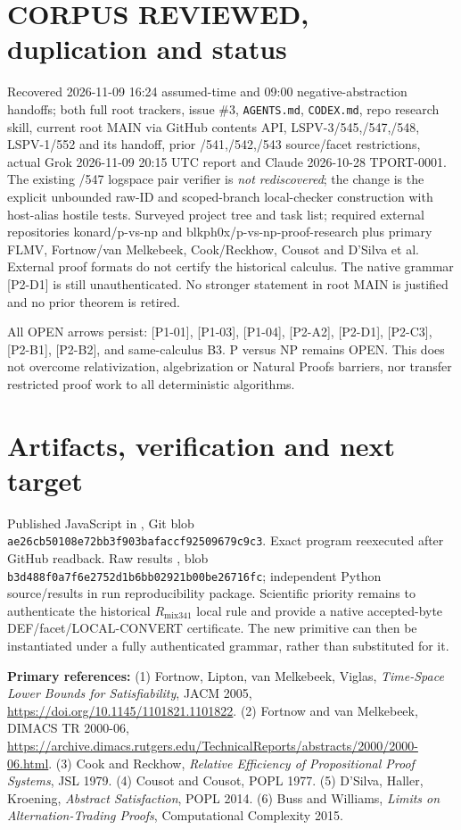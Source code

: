 \documentclass[11pt]{article}
\begin{document}
\section{CORPUS REVIEWED, duplication and status}
Recovered 2026-11-09 16:24 assumed-time and 09:00 negative-abstraction handoffs; both full root trackers, issue \#3, \texttt{AGENTS.md}, \texttt{CODEX.md}, repo research skill, current root MAIN via GitHub contents API, LSPV-3/545,/547,/548, LSPV-1/552 and its handoff, prior /541,/542,/543 source/facet restrictions, actual Grok 2026-11-09 20:15 UTC report and Claude 2026-10-28 TPORT-0001. The existing /547 logspace pair verifier is \emph{not rediscovered}; the change is the explicit unbounded raw-ID and scoped-branch local-checker construction with host-alias hostile tests. Surveyed project tree and task list; required external repositories konard/p-vs-np and blkph0x/p-vs-np-proof-research plus primary FLMV, Fortnow/van Melkebeek, Cook/Reckhow, Cousot and D'Silva et al. External proof formats do not certify the historical calculus. The native grammar [P2-D1] is still unauthenticated. No stronger statement in root MAIN is justified and no prior theorem is retired.

All OPEN arrows persist: [P1-01], [P1-03], [P1-04], [P2-A2], [P2-D1], [P2-C3], [P2-B1], [P2-B2], and same-calculus B3. P versus NP remains OPEN. This does not overcome relativization, algebrization or Natural Proofs barriers, nor transfer restricted proof work to all deterministic algorithms.

\section{Artifacts, verification and next target}
Published JavaScript in , Git blob \texttt{ae26cb50108e72bb3f903bafaccf92509679c9c3}. Exact program reexecuted after GitHub readback. Raw results , blob \texttt{b3d488f0a7f6e2752d1b6bb02921b00be26716fc}; independent Python source/results in run reproducibility package. Scientific priority remains to authenticate the historical $R_{\mathrm{mix341}}$ local rule and provide a native accepted-byte DEF/facet/LOCAL-CONVERT certificate. The new primitive can then be instantiated under a fully authenticated grammar, rather than substituted for it.

\noindent\textbf{Primary references:} (1) Fortnow, Lipton, van Melkebeek, Viglas, \emph{Time-Space Lower Bounds for Satisfiability}, JACM 2005, \url{https://doi.org/10.1145/1101821.1101822}. (2) Fortnow and van Melkebeek, DIMACS TR 2000-06, \url{https://archive.dimacs.rutgers.edu/TechnicalReports/abstracts/2000/2000-06.html}. (3) Cook and Reckhow, \emph{Relative Efficiency of Propositional Proof Systems}, JSL 1979. (4) Cousot and Cousot, POPL 1977. (5) D'Silva, Haller, Kroening, \emph{Abstract Satisfaction}, POPL 2014. (6) Buss and Williams, \emph{Limits on Alternation-Trading Proofs}, Computational Complexity 2015.

\end{document}
